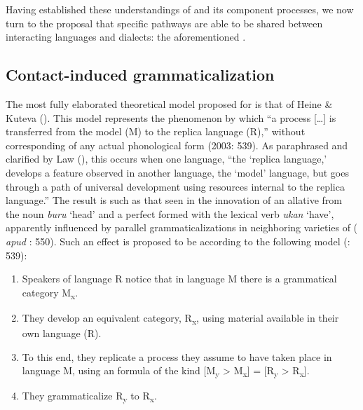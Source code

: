 \documentclass[output=paper]{langsci/langscibook}
\begin{document}
Having established these understandings of  and its component processes, we now turn to the proposal that specific  pathways are able to be shared between interacting languages and dialects: the aforementioned .

\subsection{Contact-induced grammaticalization}\label{sec:contgram}


The most fully elaborated theoretical model proposed for  is that of Heine \& Kuteva (\citeyear{HeineKuteva2003,HeineKuteva2005}). This model represents the phenomenon by which “a  process […] is transferred from the model (M) to the replica language (R),” without corresponding  of any actual phonological form (2003: 539). As paraphrased and clarified by Law (\citeyear[215]{Law2014}), this occurs when one language, “the ‘replica language,’ develops a feature observed in another language, the ‘model’ language, but goes through a path of universal development using resources internal to the replica language.” The result is such as that seen in the  innovation of an allative  from the noun \textit{buru} ‘head’ and a perfect  formed with the lexical verb \textit{ukan} ‘have’, apparently influenced by parallel grammaticalizations in neighboring varieties of  (\citealt{Haase1992} \textit{apud} \citealt{HeineKuteva2003}: 550). Such an effect is proposed to be  according to the following model (\citealt{HeineKuteva2003}: 539):

\begin{enumerate}
\item
Speakers of language R notice that in language M there is a grammatical category M\textsubscript{x}.
\item
They develop an equivalent category, R\textsubscript{x}, using material available in their own language (R).
\item
To this end, they replicate a  process they assume to have taken place in language M, using an  formula of the kind [M\textsubscript{y} > M\textsubscript{x}] = [R\textsubscript{y} > R\textsubscript{x}].
\item
They grammaticalize R\textsubscript{y} to R\textsubscript{x}. 
\end{enumerate} 
\end{document}
